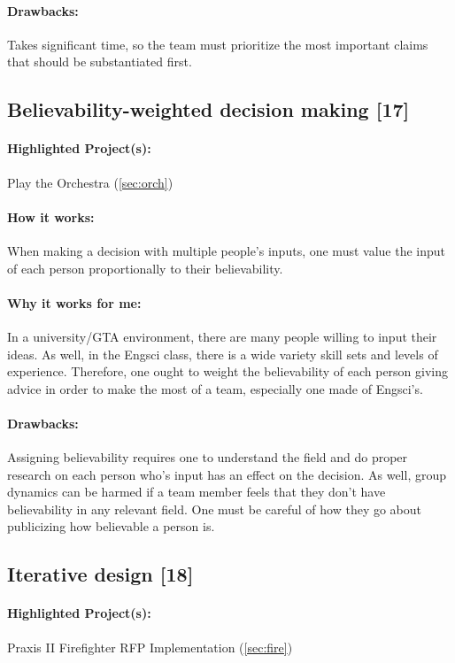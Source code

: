 \documentclass[a4paper,12pt]{article}
\begin{document}
\paragraph{Drawbacks: }
Takes significant time, so the team must prioritize the most important claims that should be substantiated first.


\subsection{Believability-weighted decision making [17]}
\label{sec:believe}
\paragraph{Highlighted Project(s): } Play the Orchestra (\ref{sec:orch})

\paragraph{How it works: }
When making a decision with multiple people’s inputs, one must value the input of each person proportionally to their believability.

\paragraph{Why it works for me: }
In a university/GTA environment, there are many people willing to input their ideas. As well, in the Engsci class, there is a wide variety skill sets and levels of experience. Therefore, one ought to weight the believability of each person giving advice in order to make the most of a team, especially one made of Engsci’s.


\paragraph{Drawbacks: }
Assigning believability requires one to understand the field and do proper research on each person who’s input has an effect on the decision. As well, group dynamics can be harmed if a team member feels that they don’t have believability in any relevant field. One must be careful of how they go about publicizing how believable a person is.


\subsection{Iterative design [18]}
\label{sec:iter}
\paragraph{Highlighted Project(s): } Praxis II Firefighter RFP Implementation (\ref{sec:fire})
\end{document}
